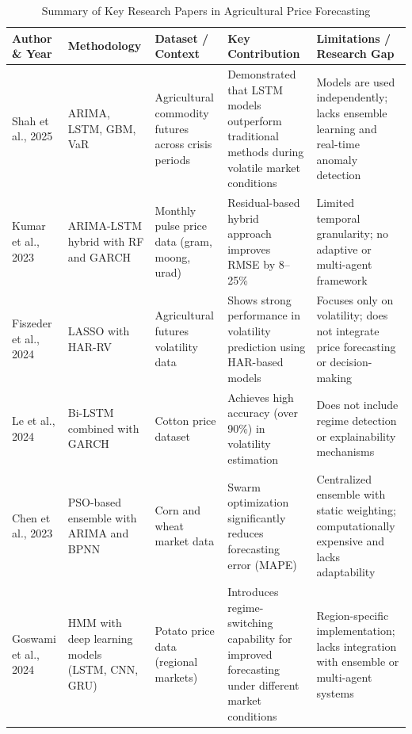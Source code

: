 \documentclass[12pt,a4paper]{report}
\begin{document}
\begin{table}[H]
\centering
\caption{Summary of Key Research Papers in Agricultural Price Forecasting}
\setlength{\tabcolsep}{4pt}
\renewcommand{\arraystretch}{1.4}
\small

\begin{tabular}{|p{2.2cm}|p{2.5cm}|p{3cm}|p{3.2cm}|p{3.5cm}|}
\hline
\rowcolor{gray!20}
\textbf{Author \& Year} & \textbf{Methodology} & \textbf{Dataset / Context} & \textbf{Key Contribution} & \textbf{Limitations / Research Gap} \\
\hline

Shah et al., 2025 
& ARIMA, LSTM, GBM, VaR 
& Agricultural commodity futures across crisis periods 
& Demonstrated that LSTM models outperform traditional methods during volatile market conditions 
& Models are used independently; lacks ensemble learning and real-time anomaly detection \\ \hline

Kumar et al., 2023 
& ARIMA-LSTM hybrid with RF and GARCH 
& Monthly pulse price data (gram, moong, urad) 
& Residual-based hybrid approach improves RMSE by 8--25\% 
& Limited temporal granularity; no adaptive or multi-agent framework \\ \hline

Fiszeder et al., 2024 
& LASSO with HAR-RV 
& Agricultural futures volatility data 
& Shows strong performance in volatility prediction using HAR-based models 
& Focuses only on volatility; does not integrate price forecasting or decision-making \\ \hline

Le et al., 2024 
& Bi-LSTM combined with GARCH 
& Cotton price dataset 
& Achieves high accuracy (over 90\%) in volatility estimation 
& Does not include regime detection or explainability mechanisms \\ \hline

Chen et al., 2023 
& PSO-based ensemble with ARIMA and BPNN 
& Corn and wheat market data 
& Swarm optimization significantly reduces forecasting error (MAPE) 
& Centralized ensemble with static weighting; computationally expensive and lacks adaptability \\ \hline

Goswami et al., 2024 
& HMM with deep learning models (LSTM, CNN, GRU) 
& Potato price data (regional markets) 
& Introduces regime-switching capability for improved forecasting under different market conditions 
& Region-specific implementation; lacks integration with ensemble or multi-agent systems \\ \hline

\end{tabular}
\end{table}
\end{document}
